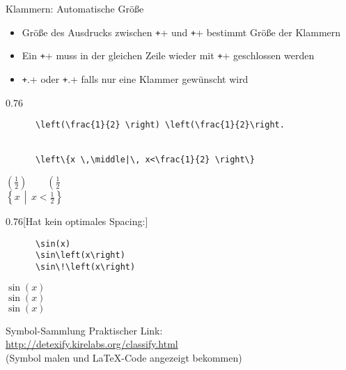 \begin{frame}[fragile]{Klammern: Automatische Größe}
  \begin{itemize}
    \item Größe des Ausdrucks zwischen \texttt+\left+ und \texttt+\right+ bestimmt Größe der Klammern
    \item Ein \texttt+\left+ muss in der gleichen Zeile wieder mit \texttt+\right+ geschlossen werden
    \item \texttt+\left.+ oder \texttt+\right.+ falls nur eine Klammer gewünscht wird
  \end{itemize}
  \begin{CodeExample}{0.76}
    \begin{verbatim}
      \left(\frac{1}{2} \right) \left(\frac{1}{2}\right.


      \left\{x \,\middle|\, x<\frac{1}{2} \right\}
    \end{verbatim}
  \CodeResult
    $\left(\frac{1}{2}\right) \qquad \left(\frac{1}{2}\right.$ \\[2\baselineskip]
      $\left\{ x \, \middle| \, x < \frac{1}{2} \right\}$
  \end{CodeExample}

  \begin{CodeExample}{0.76}[Hat kein optimales Spacing:]
    \begin{verbatim}
      \sin(x)
      \sin\left(x\right)
      \sin\!\left(x\right)
    \end{verbatim}
  \CodeResult
    \strut
    $\sin(x)$ \\
    $\sin\left(x\right)$ \\
    $\sin\!\left(x\right)$
  \end{CodeExample}
\end{frame}

\begin{frame}[fragile]{
  Symbol-Sammlung
  \hfill
}
  Praktischer Link: \\
  \href{http://detexify.kirelabs.org/classify.html}{http://detexify.kirelabs.org/classify.html} \\
  (Symbol malen und \LaTeX-Code angezeigt bekommen)
\end{frame}

